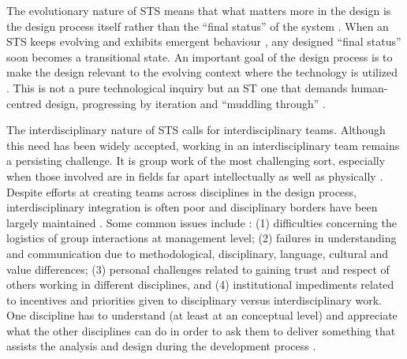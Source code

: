 The evolutionary nature of STS means that what matters more in the design is the design process itself rather than the ``final status'' of the system \cite{Shin2014}. When an STS keeps evolving and exhibits emergent behaviour \cite{Nikolic2009}, any designed ``final status'' soon becomes a transitional state. An important goal of the design process is to make the design relevant to the evolving context where the technology is utilized \cite{Shin2014}. This is not a pure technological inquiry but an ST one that demands human-centred design, progressing by iteration and ``muddling through'' \cite{Norman2015}. 

The interdisciplinary nature of STS calls for interdisciplinary teams. Although this need has been widely accepted, working in an interdisciplinary team remains a persisting challenge. 
It is group work of the most challenging sort, especially when those involved are in fields far apart intellectually as well as physically \cite{Brewer1999}. 
Despite efforts at creating teams across disciplines in the design process, interdisciplinary integration is often poor and disciplinary borders have been largely maintained \cite{Baxter2011}. Some common issues include \cite{Baxter2011,Brewer1999,Norman2015}: (1) difficulties concerning the logistics of group interactions at management level; (2) failures in understanding and communication due to methodological, disciplinary, language, cultural and value differences; (3) personal challenges related to gaining trust and respect of others working in different disciplines, and (4) institutional impediments related to incentives and priorities given to disciplinary versus interdisciplinary work.
% 
One discipline has to understand (at least at an conceptual level) and appreciate what the other disciplines can do in order to ask them to deliver something that assists the analysis and design during the development process \cite{Baxter2011}. 


